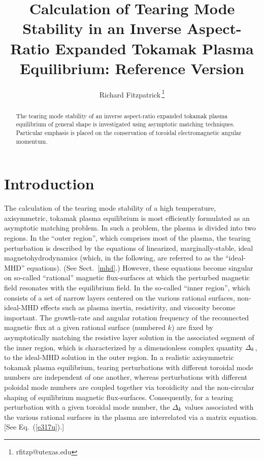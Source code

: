 \documentclass[12pt,prb,aps]{revtex4-1}
\begin{document}
\title{Calculation of Tearing Mode Stability in an Inverse Aspect-Ratio Expanded Tokamak Plasma Equilibrium: Reference Version}
\author{Richard Fitzpatrick\,\footnote{rfitzp@utexas.edu}}

\begin{abstract}
The   tearing mode stability of an inverse aspect-ratio expanded tokamak plasma equilibrium of general
shape  is investigated using asymptotic matching techniques. Particular emphasis is placed on the
conservation of toroidal electromagnetic angular momentum.
\end{abstract}
\maketitle

\section{Introduction} 
The calculation of the tearing mode stability of a high temperature, axisymmetric,  tokamak plasma equilibrium is most efficiently formulated as  an asymptotic
matching problem.\cite{fkr} In such a problem, the  plasma is  divided into two regions. In the ``outer region'', which comprises most
of the plasma, the tearing perturbation is described by the equations of linearized, marginally-stable, ideal magnetohydrodynamics (which, in the following, are
referred to as the ``ideal-MHD'' equations). (See Sect.~\ref{mhd}.)
However, these equations become singular on so-called ``rational'' magnetic flux-surfaces at which the perturbed magnetic field resonates with the equilibrium field. In the so-called ``inner region'', which
consists of a set of narrow layers centered on the various rational surfaces, non-ideal-MHD effects such as plasma inertia, resistivity, and
viscosity become important. The growth-rate and angular rotation frequency of the reconnected magnetic flux at a given rational
surface (numbered $k$) are fixed by asymptotically matching the resistive layer
solution in the associated segment of the inner region, which is characterized by a dimensionless complex quantity ${\mit\Delta}_k$,  to the ideal-MHD solution in the outer region. In a realistic axisymmetric tokamak  plasma equilibrium, tearing
perturbations with different toroidal mode numbers are independent of one another, whereas perturbations with different poloidal
mode numbers are coupled together via toroidicity and the non-circular shaping of equilibrium magnetic flux-surfaces.\cite{con0}
Consequently, for a tearing perturbation with a given toroidal mode number, 
 the ${\mit\Delta}_k$ values associated with  the various rational surfaces in the plasma are interrelated via a matrix equation.\cite{cht} [See Eq.~(\ref{e317u}).]
\end{document}
